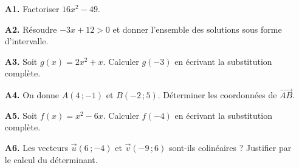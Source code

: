 \documentclass[10pt,a4paper]{article}
\begin{document}
\newpage
{}
\begin{enumerate}
\needspace{22mm}
\item[\textbf{A1.}] Factoriser $16x^2 - 49$.
\par\vspace{1.2mm}
\needspace{22mm}
\item[\textbf{A2.}] Résoudre $-3x + 12 > 0$ et donner l'ensemble des solutions sous forme d'intervalle.
\par\vspace{1.2mm}
\needspace{22mm}
\item[\textbf{A3.}] Soit $g(x) = 2x^2 + x$. Calculer $g(-3)$ en écrivant la substitution complète.
\par\vspace{1.2mm}
\needspace{22mm}
\item[\textbf{A4.}] On donne $A(4\,;-1)$ et $B(-2\,;5)$. Déterminer les coordonnées de $\vec{AB}$.
\par\vspace{1.2mm}
\needspace{22mm}
\item[\textbf{A5.}] Soit $f(x) = x^2 - 6x$. Calculer $f(-4)$ en écrivant la substitution complète.
\par\vspace{1.2mm}
\needspace{22mm}
\item[\textbf{A6.}] Les vecteurs $\vec{u}(6\,;-4)$ et $\vec{v}(-9\,;6)$ sont-ils colinéaires ? Justifier par le calcul du déterminant.
\par\vspace{1.2mm}
\end{enumerate}
\needspace{68mm}\par\vspace{3mm}
\end{document}
